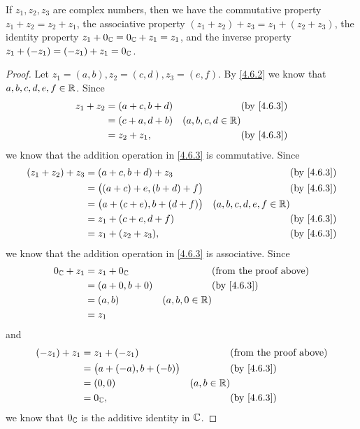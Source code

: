 \begin{lem}\label{4.6.4}
  If \(z_1, z_2, z_3\) are complex numbers, then we have the commutative property \(z_1 + z_2 = z_2 + z_1\), the associative property \((z_1 + z_2) + z_3 = z_1 + (z_2 + z_3)\), the identity property \(z_1 + 0_{\mathbb{C}} = 0_{\mathbb{C}} + z_1 = z_1\), and the inverse property \(z_1 + (-z_1) = (-z_1) + z_1 = 0_{\mathbb{C}}\).
\end{lem}

\begin{proof}
  Let \(z_1 = (a, b), z_2 = (c, d), z_3 = (e, f)\).
  By \cref{4.6.2} we know that \(a, b, c, d, e, f \in \mathbb{R}\).
  Since
  \begin{align*}
    z_1 + z_2 & = (a + c, b + d) &                     & \by{4.6.3} \\
              & = (c + a, d + b) & (a, b, c, d \in \R)              \\
              & = z_2 + z_1,     &                     & \by{4.6.3}
  \end{align*}
  we know that the addition operation in \cref{4.6.3} is commutative.
  Since
  \begin{align*}
    (z_1 + z_2) + z_3 & = (a + c, b + d) + z_3               &                           & \by{4.6.3} \\
                      & = \big((a + c) + e, (b + d) + f\big) &                           & \by{4.6.3} \\
                      & = \big(a + (c + e), b + (d + f)\big) & (a, b, c, d, e, f \in \R)              \\
                      & = z_1 + (c + e, d + f)               &                           & \by{4.6.3} \\
                      & = z_1 + (z_2 + z_3),                 &                           & \by{4.6.3}
  \end{align*}
  we know that the addition operation in \cref{4.6.3} is associative.
  Since
  \begin{align*}
    0_{\C} + z_1 & = z_1 + 0_{\C}   &                  & \text{(from the proof above)} \\
                 & = (a + 0, b + 0) &                  & \by{4.6.3}                    \\
                 & = (a, b)         & (a, b, 0 \in \R)                                 \\
                 & = z_1
  \end{align*}
  and
  \begin{align*}
    (-z_1) + z_1 & = z_1 + (-z_1)                 &               & \text{(from the proof above)} \\
                 & = \big(a + (-a), b + (-b)\big) &               & \by{4.6.3}                    \\
                 & = (0, 0)                       & (a, b \in \R)                                 \\
                 & = 0_{\C},                      &               & \by{4.6.3}
  \end{align*}
  we know that \(0_{\mathbb{C}}\) is the additive identity in \(\mathbb{C}\).
\end{proof}

